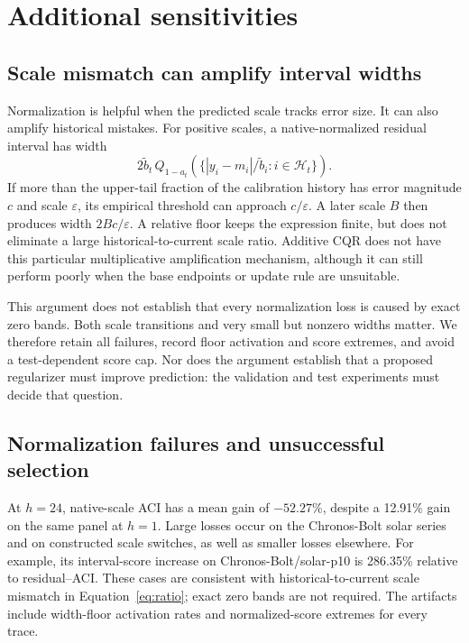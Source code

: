 \documentclass[preprint,11pt]{elsarticle}
\begin{document}
\clearpage
\section{Additional sensitivities}\label{app:sensitivity}
\subsection{Scale mismatch can amplify interval widths}
Normalization is helpful when the predicted scale tracks error size. It can also amplify
historical mistakes. For positive scales, a native-normalized residual interval has width
\begin{equation}\label{eq:ratio}
 2\tilde b_t\,Q_{1-a_t}\!\left(\{|y_i-m_i|/\tilde b_i:i\in\mathcal H_t\}\right).
\end{equation}
If more than the upper-tail fraction of the calibration history has error magnitude $c$
and scale $\varepsilon$, its empirical threshold can approach $c/\varepsilon$. A later
scale $B$ then produces width $2Bc/\varepsilon$. A relative floor keeps the expression
finite, but does not eliminate a large historical-to-current scale ratio. Additive CQR
does not have this particular multiplicative amplification mechanism, although it can
still perform poorly when the base endpoints or update rule are unsuitable.

This argument does not establish that every normalization loss is caused by exact zero
bands. Both scale transitions and very small but nonzero widths matter. We therefore
retain all failures, record floor activation and score extremes, and avoid a test-dependent
score cap. Nor does the argument establish that a proposed regularizer must improve
prediction: the validation and test experiments must decide that question.

\subsection{Normalization failures and unsuccessful selection}
At $h=24$, native-scale ACI has a mean gain of $-52.27\%$, despite a 12.91\% gain on
the same panel at $h=1$. Large losses occur on the Chronos-Bolt solar series and on
constructed scale switches, as well as smaller losses elsewhere. For example, its
interval-score increase on Chronos-Bolt/solar-p10 is 286.35\% relative to residual--ACI.
These cases are consistent with historical-to-current scale mismatch in
Equation~\eqref{eq:ratio}; exact zero bands are not required. The artifacts include
width-floor activation rates and normalized-score extremes for every trace.
\end{document}
